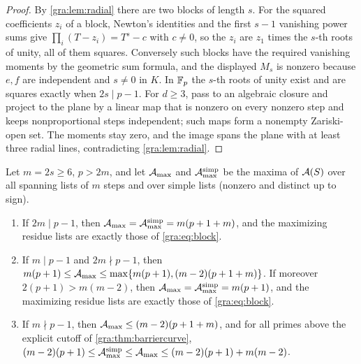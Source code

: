 \begin{proof}
By \cref{gra:lem:radial} there are two blocks of length $s$. For the
squared coefficients $z_i$ of a block, Newton's identities and the first
$s-1$ vanishing power sums give $\prod_i(T-z_i)=T^s-c$ with $c\ne0$, so
the $z_i$ are $z_1$ times the $s$-th roots of unity, all of them squares.
Conversely such blocks have the required vanishing moments by the
geometric sum formula, and the displayed $M_s$ is nonzero because $e,f$ are
independent and $s\ne0$ in $K$. In $\mathbb{F}_p$ the $s$-th roots of unity exist and
are squares exactly when $2s\mid p-1$. For $d\ge3$, pass to an algebraic
closure and project to the plane by a linear map that is nonzero on every
nonzero step and keeps nonproportional steps independent; such maps form a
nonempty Zariski-open set. The moments stay zero, and the image spans the
plane with at least three radial lines, contradicting
\cref{gra:lem:radial}.
\end{proof}

\begin{theorem}\label{gra:thm:evenmax}
Let $m=2s\ge6$, $p>2m$, and let $\mathcal{A}_{\max}$ and $\mathcal{A}^{\mathrm{simp}}_{\max}$
be the maxima of $\mathcal{A}(S)$ over all spanning lists of $m$ steps and over
simple lists (nonzero and distinct up to sign).
\begin{enumerate}[label=\textup{(\roman*)}]
\item If $2m\mid p-1$, then $\mathcal{A}_{\max}=\mathcal{A}^{\mathrm{simp}}_{\max}=m(p+1+m)$,
 and the maximizing residue lists are exactly those of \eqref{gra:eq:block}.
\item If $m\mid p-1$ and $2m\nmid p-1$, then
 $m(p+1)\le\mathcal{A}_{\max}\le\max\{m(p+1),(m-2)(p+1+m)\}$. If moreover
 $2(p+1)>m(m-2)$, then $\mathcal{A}_{\max}=\mathcal{A}^{\mathrm{simp}}_{\max}=m(p+1)$, and
 the maximizing residue lists are exactly those of \eqref{gra:eq:block}.
\item If $m\nmid p-1$, then $\mathcal{A}_{\max}\le(m-2)(p+1+m)$, and for all primes
 above the explicit cutoff of \cref{gra:thm:barriercurve},
 $(m-2)(p+1)\le\mathcal{A}^{\mathrm{simp}}_{\max}\le\mathcal{A}_{\max}\le(m-2)(p+1)+m(m-2)$.
\end{enumerate}
\end{theorem}

